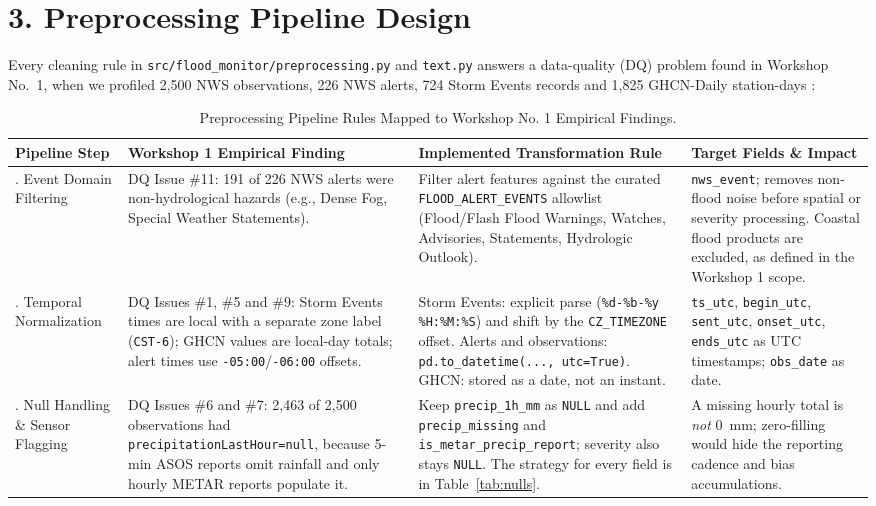 \documentclass[stu, 12pt, letterpaper, donotrepeattitle, floatsintext, natbib]{apa7}
\begin{document}
\section{\large 3. Preprocessing Pipeline Design}
Every cleaning rule in \texttt{src/flood\_monitor/preprocessing.py} and \texttt{text.py} answers a data-quality (DQ) problem found in Workshop No.~1, when we profiled 2,500 NWS observations, 226 NWS alerts, 724 Storm Events records and 1,825 GHCN-Daily station-days \citep{nws2026}:

\begin{table}[H]
\centering
\scriptsize
\caption{Preprocessing Pipeline Rules Mapped to Workshop No. 1 Empirical Findings.}
\label{tab:preprocessing_rules}
\begin{tabularx}{\textwidth}{>{\raggedright\arraybackslash}p{2.2cm} >{\raggedright\arraybackslash}p{3.6cm} >{\raggedright\arraybackslash}p{4.6cm} >{\raggedright\arraybackslash}X}
\toprule
\textbf{Pipeline Step} & \textbf{Workshop 1 Empirical Finding} & \textbf{Implemented Transformation Rule} & \textbf{Target Fields \& Impact} \\
\midrule
1. Event Domain Filtering & DQ Issue \#11: 191 of 226 NWS alerts were non-hydrological hazards (e.g., Dense Fog, Special Weather Statements). & Filter alert features against the curated \texttt{FLOOD\_ALERT\_EVENTS} allowlist (Flood/Flash Flood Warnings, Watches, Advisories, Statements, Hydrologic Outlook). & \texttt{nws\_event}; removes non-flood noise before spatial or severity processing. Coastal flood products are excluded, as defined in the Workshop 1 scope. \\
\addlinespace
2. Temporal Normalization & DQ Issues \#1, \#5 and \#9: Storm Events times are local with a separate zone label (\texttt{CST-6}); GHCN values are local-day totals; alert times use \texttt{-05:00}/\texttt{-06:00} offsets. & Storm Events: explicit parse (\texttt{\%d-\%b-\%y \%H:\%M:\%S}) and shift by the \texttt{CZ\_TIMEZONE} offset. Alerts and observations: \texttt{pd.to\_datetime(..., utc=True)}. GHCN: stored as a date, not an instant. & \texttt{ts\_utc}, \texttt{begin\_utc}, \texttt{sent\_utc}, \texttt{onset\_utc}, \texttt{ends\_utc} as UTC timestamps; \texttt{obs\_date} as date. \\
\addlinespace
3. Null Handling \& Sensor Flagging & DQ Issues \#6 and \#7: 2,463 of 2,500 observations had \texttt{precipitationLastHour=null}, because 5-min ASOS reports omit rainfall and only hourly METAR reports populate it. & Keep \texttt{precip\_1h\_mm} as \texttt{NULL} and add \texttt{precip\_missing} and \texttt{is\_metar\_precip\_report}; severity also stays \texttt{NULL}. The strategy for every field is in Table~\ref{tab:nulls}. & A missing hourly total is \emph{not} 0~mm; zero-filling would hide the reporting cadence and bias accumulations. \\

\end{tabularx}
\end{table}
\end{document}
